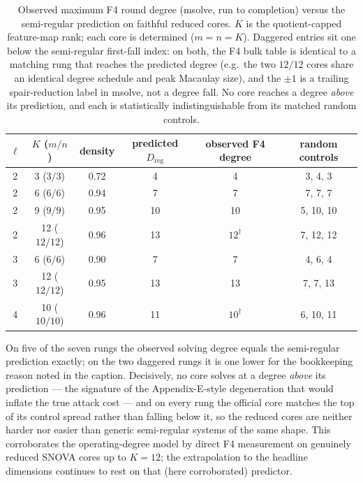 \documentclass[runningheads]{llncs}
\begin{document}
\begin{table}[t]
\centering
\caption{Observed maximum F4 round degree (msolve, run to completion) versus the
semi-regular prediction on faithful reduced cores.  $K$ is the quotient-capped
feature-map rank; each core is determined ($m=n=K$).  Daggered entries sit one
below the semi-regular first-fall index: on both, the F4 bulk table is identical
to a matching rung that reaches the predicted degree (e.g.\ the two $12/12$
cores share an identical degree schedule and peak Macaulay size), and the $\pm1$
is a trailing spair-reduction label in msolve, not a degree fall.  No core
reaches a degree \emph{above} its prediction, and each is statistically
indistinguishable from its matched random controls.}
\label{tab:ladder}
\begin{tabular}{cccccc}
\toprule
$\ell$ & $K$ ($m/n$) & density & predicted $D_\mathrm{reg}$ & observed F4 degree & random controls \\
\midrule
2 & 3 ($3/3$)    & 0.72 & 4  & 4              & 3, 4, 3   \\
2 & 6 ($6/6$)    & 0.94 & 7  & 7              & 7, 7, 7   \\
2 & 9 ($9/9$)    & 0.95 & 10 & 10             & 5, 10, 10 \\
2 & 12 ($12/12$) & 0.96 & 13 & $12^{\dagger}$ & 7, 12, 12 \\
3 & 6 ($6/6$)    & 0.90 & 7  & 7              & 4, 6, 4   \\
3 & 12 ($12/12$) & 0.95 & 13 & 13             & 7, 7, 13  \\
4 & 10 ($10/10$) & 0.96 & 11 & $10^{\dagger}$ & 6, 10, 11 \\
\bottomrule
\end{tabular}
\end{table}

On five of the seven rungs the observed solving degree equals the semi-regular
prediction exactly; on the two daggered rungs it is one lower for the bookkeeping
reason noted in the caption.  Decisively, no core solves at a degree
\emph{above} its prediction --- the signature of the Appendix-E-style
degeneration that would inflate the true attack cost --- and on every rung the
official core matches the top of its control spread rather than falling below it,
so the reduced cores are neither harder nor easier than generic semi-regular
systems of the same shape.  This corroborates the operating-degree model by
direct F4 measurement on genuinely reduced SNOVA cores up to $K=12$; the
extrapolation to the headline dimensions continues to rest on that (here
corroborated) predictor.
\end{document}
